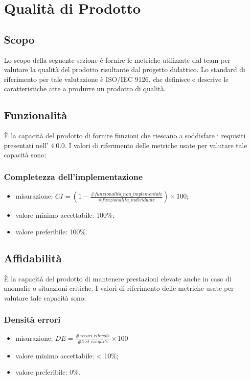 \section{Qualità di Prodotto}
\subsection{Scopo}
Lo scopo della seguente sezione è fornire le metriche utilizzate dal team \Gruppo{} per valutare la qualità del prodotto risultante dal progetto didattico. Lo standard di riferimento per tale valutazione è ISO/IEC 9126, che definisce e descrive le caratteristiche atte a produrre un prodotto di qualità.

\subsection{Funzionalità}
È la capacità del prodotto di fornire funzioni che riescano a soddisfare i requisiti presentati nell'\textit{\AdR} 4.0.0.
I valori di riferimento delle metriche usate per valutare tale capacità sono:

	\subsubsection*{Completezza dell'implementazione}
	\begin{itemize}
	\item{misurazione: $CI = (1- \displaystyle\frac{\#funzionalit\grave{a}\_non\_implementate}{\#funzionalit\grave{a}\_individuate})\times100$};
	\item {valore minimo accettabile: 100\%;}
	\item {valore preferibile: 100\%.}
	\end{itemize}
	
\subsection{Affidabilità}
È la capacità del prodotto di mantenere prestazioni elevate anche in caso di anomalie o situazioni critiche.
I valori di riferimento delle metriche usate per valutare tale capacità sono:

	\subsubsection*{Densità errori}
	\begin{itemize}
		\item{misurazione: $DE = \displaystyle\frac{\#errori\_rilevati}{\#test\_eseguiti}\times100$}
		\item {valore minimo accettabile: < 10\%;}
		\item {valore preferibile: 0\%.}
	\end{itemize}

